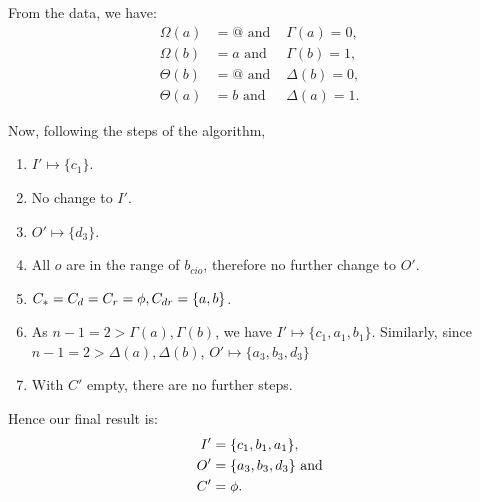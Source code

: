 From the data, we have:
\begin{align*}
  \Omega(a) &= @\text{ and }&\Gamma(a)=0,\\
  \Omega(b) &= a\text{ and }&\Gamma(b) = 1,\\
  \Theta(b)&=@\text{ and }&\Delta(b)=0,\\
  \Theta(a)&=b\text{ and }&\Delta(a)=1.
\end{align*}

Now, following the steps of the algorithm,
\begin{enumerate}
  \item $I' \mapsto \{c_1\}$.
  \item No change to $I'$.
  \item $O' \mapsto \{d_3\}$.
  \item All $o$ are in the range of $b_{cio}$, therefore no further
    change to $O'$.
  \item $C_*=C_d=C_r = \phi, C_{dr}=\{a,b\}$.
  \item As $n-1=2 > \Gamma(a),\Gamma(b)$, we have $I'
    \mapsto \{c_1,a_1,b_1\}$. Similarly, since $n-1=2 > \Delta(a),\Delta(b)$,
    $O'\mapsto \{a_3,b_3,d_3\}$
  \item With $C'$ empty, there are no further steps.
\end{enumerate}
Hence our final result is:
\begin{align*}
  I'&=\{c_1,b_1,a_1\},\\
  O'&=\{a_3,b_3,d_3\}\text{ and}\\
  C'&=\phi.
\end{align*}

